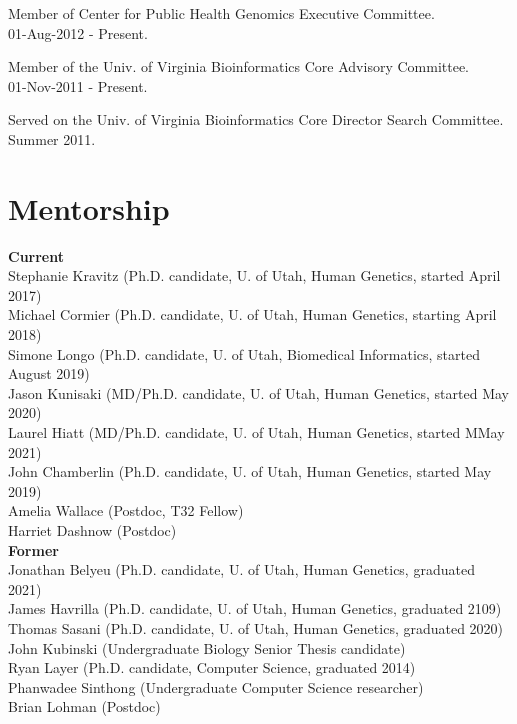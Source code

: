 \documentclass[margin,line]{cv}
\begin{document}
\begin{resume}
    Member of Center for Public Health Genomics Executive Committee.\\
    01-Aug-2012 - Present.

    \vspace{-2mm}
    Member of the Univ. of Virginia Bioinformatics Core Advisory Committee.\\
    01-Nov-2011 - Present.

    \vspace{-2mm}
    Served on the Univ. of Virginia Bioinformatics Core Director Search Committee. \\
    Summer 2011.



    \section{\mysidestyle Mentorship}
    \textbf{Current} \\
    Stephanie Kravitz (Ph.D. candidate, U. of Utah, Human Genetics, started April 2017) \\
    Michael Cormier (Ph.D. candidate, U. of Utah, Human Genetics, starting April 2018) \\
    Simone Longo (Ph.D. candidate, U. of Utah, Biomedical Informatics, started August 2019) \\
    Jason Kunisaki  (MD/Ph.D. candidate, U. of Utah, Human Genetics, started May 2020) \\
    Laurel Hiatt  (MD/Ph.D. candidate, U. of Utah, Human Genetics, started MMay 2021) \\
    John Chamberlin  (Ph.D. candidate, U. of Utah, Human Genetics, started May 2019) \\
    Amelia Wallace (Postdoc, T32 Fellow) \\
    Harriet Dashnow (Postdoc) \\


    \textbf{Former} \\
    Jonathan Belyeu (Ph.D. candidate, U. of Utah, Human Genetics, graduated 2021) \\
    James Havrilla (Ph.D. candidate, U. of Utah, Human Genetics, graduated 2109) \\
    Thomas Sasani (Ph.D. candidate, U. of Utah, Human Genetics, graduated 2020) \\
    John Kubinski (Undergraduate Biology Senior Thesis candidate)  \\
    Ryan Layer (Ph.D. candidate, Computer Science, graduated 2014) \\
    Phanwadee Sinthong (Undergraduate Computer Science researcher) \\
    Brian Lohman (Postdoc) \\


\end{resume}
\end{document}
